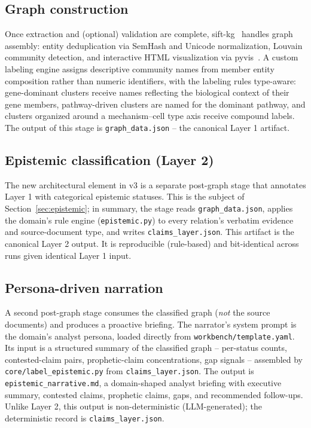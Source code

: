 \subsection{Graph construction}

Once extraction and (optional) validation are complete, sift-kg~\cite{sifkg2024} handles graph assembly: entity deduplication via SemHash and Unicode normalization, Louvain community detection, and interactive HTML visualization via pyvis~\cite{pyvis2018}. A custom labeling engine assigns descriptive community names from member entity composition rather than numeric identifiers, with the labeling rules type-aware: gene-dominant clusters receive names reflecting the biological context of their gene members, pathway-driven clusters are named for the dominant pathway, and clusters organized around a mechanism--cell type axis receive compound labels. The output of this stage is \texttt{graph\_data.json} -- the canonical Layer 1 artifact.

\subsection{Epistemic classification (Layer 2)}

The new architectural element in v3 is a separate post-graph stage that annotates Layer 1 with categorical epistemic statuses. This is the subject of Section~\ref{sec:epistemic}; in summary, the stage reads \texttt{graph\_data.json}, applies the domain's rule engine (\texttt{epistemic.py}) to every relation's verbatim evidence and source-document type, and writes \texttt{claims\_layer.json}. This artifact is the canonical Layer 2 output. It is reproducible (rule-based) and bit-identical across runs given identical Layer 1 input.

\subsection{Persona-driven narration}

A second post-graph stage consumes the classified graph (\emph{not} the source documents) and produces a proactive briefing. The narrator's system prompt is the domain's analyst persona, loaded directly from \texttt{workbench/template.yaml}. Its input is a structured summary of the classified graph -- per-status counts, contested-claim pairs, prophetic-claim concentrations, gap signals -- assembled by \texttt{core/label\_epistemic.py} from \texttt{claims\_layer.json}. The output is \texttt{epistemic\_narrative.md}, a domain-shaped analyst briefing with executive summary, contested claims, prophetic claims, gaps, and recommended follow-ups. Unlike Layer 2, this output is non-deterministic (LLM-generated); the deterministic record is \texttt{claims\_layer.json}.

